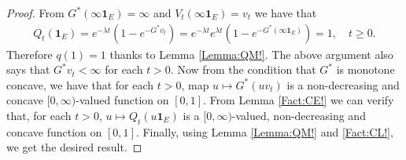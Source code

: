 \documentclass[12pt,a4paper]{amsart}
\numberwithin{equation}{section}
\theoremstyle{plain}
\theoremstyle{definition}
\theoremstyle{remark}
\newcounter{N}
\newcounter{n}[N]
\begin{document}
\begin{proof}
From $G^*(\infty \mathbf 1_E) = \infty$ and $V_t(\infty \mathbf 1_E) = v_t$ we have that
\begin{align}
Q_t(\mathbf 1_E) 
= e^{- \lambda t} ( 1-e^{-G^*v_t} ) 
= e^{- \lambda t} e^{\lambda t}( 1-e^{-G^*(\infty\mathbf 1_E)} )
= 1,
\quad t\geq 0.\end{align}
Therefore $q(1) = 1$ thanks to Lemma \ref{Lemma:QM!}.
The above argument also says that $G^*v_t < \infty$ for each $t>0$. 
Now from the condition that $G^*$ is monotone concave, we have that for each $t>0$, map $u \mapsto G^*(uv_t)$ is a non-decreasing and concave $[0,\infty)$-valued function on $[0,1]$.
From Lemma \ref{Fact:CE!} we can verify that, for each $t> 0$, $u \mapsto Q_t(u \mathbf 1_E)$ is a $[0,\infty)$-valued, non-decreasing and concave function on $[0,1]$.
Finally, using Lemma \ref{Lemma:QM!} and \ref{Fact:CL!}, we get the desired result. 
\end{proof}
\end{document}
